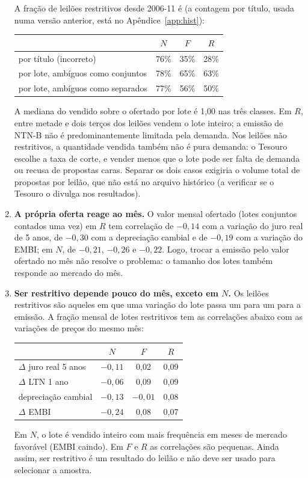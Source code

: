 \documentclass[12pt,a4paper]{article}
\begin{document}
\begin{enumerate}[leftmargin=1.2cm]
    A fração de leilões restritivos desde 2006-11 é (a contagem por título, usada
    numa versão anterior, está no Apêndice~\ref{app:hist}):
    \begin{center}
    \small
    \begin{tabular}{lccc}
    \toprule
     & \(N\) & \(F\) & \(R\) \\
    \midrule
    por título (incorreto) & 76\% & 35\% & 28\% \\
    por lote, ambíguos como conjuntos & 78\% & 65\% & 63\% \\
    por lote, ambíguos como separados & 77\% & 56\% & 50\% \\
    \bottomrule
    \end{tabular}
    \end{center}
    A mediana do vendido sobre o ofertado por lote é 1,00 nas três classes. Em \(R\),
    entre metade e dois terços dos leilões vendem o lote inteiro; a emissão de
    NTN-B não é predominantemente limitada pela demanda. Nos leilões não
    restritivos, a quantidade vendida também não é pura demanda: o Tesouro escolhe a
    taxa de corte, e vender menos que o lote pode ser falta de demanda ou recusa de
    propostas caras. Separar os dois casos exigiria o volume total de propostas por
    leilão, que não está no arquivo histórico (a verificar se o Tesouro o divulga
    nos resultados).
    \item \textbf{A própria oferta reage ao mês.} O valor mensal ofertado (lotes
    conjuntos contados uma vez) em \(R\) tem correlação de \(-0{,}14\) com a variação
    do juro real de 5 anos, de \(-0{,}30\) com a depreciação cambial e de \(-0{,}19\)
    com a variação do EMBI; em \(N\), de \(-0{,}21\), \(-0{,}26\) e \(-0{,}22\). Logo,
    trocar a emissão pelo valor ofertado no mês não resolve o problema: o tamanho
    dos lotes também responde ao mercado do mês.
    \item \textbf{Ser restritivo depende pouco do mês, exceto em \(N\).} Os leilões
    restritivos são aqueles em que uma variação do lote passa um para um para a
    emissão. A fração mensal de lotes restritivos tem as correlações abaixo com as
    variações de preços do mesmo mês:
    \begin{center}
    \small
    \begin{tabular}{lccc}
    \toprule
     & \(N\) & \(F\) & \(R\) \\
    \midrule
    \(\Delta\) juro real 5 anos & \(-0{,}11\) & 0,02 & 0,09 \\
    \(\Delta\) LTN 1 ano & \(-0{,}06\) & 0,09 & 0,09 \\
    depreciação cambial & \(-0{,}13\) & \(-0{,}01\) & 0,08 \\
    \(\Delta\) EMBI & \(-0{,}24\) & 0,08 & 0,07 \\
    \bottomrule
    \end{tabular}
    \end{center}
    Em \(N\), o lote é vendido inteiro com mais frequência em meses de mercado
    favorável (EMBI caindo). Em \(F\) e \(R\) as correlações são pequenas. Ainda
    assim, ser restritivo é um resultado do leilão e não deve ser usado para
    selecionar a amostra.
\end{enumerate}
\end{document}
